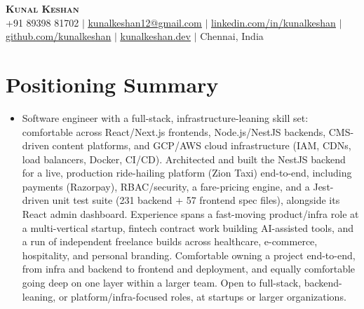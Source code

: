 \documentclass[letterpaper,11pt]{article}
\newcommand{\resumeItem}[1]{
  \item\small{
    {#1 \vspace{-2pt}}
  }
}
\newcommand{\resumeSubHeadingListStart}{\begin{itemize}[leftmargin=0.15in, label={}]}
\newcommand{\resumeSubHeadingListEnd}{\end{itemize}}
\begin{document}
\begin{center}
    \textbf{\Huge \scshape Kunal Keshan} \\ \vspace{1pt}
    \small +91 89398 81702 $|$ \href{mailto:kunalkeshan12@gmail.com}{\underline{kunalkeshan12@gmail.com}} $|$
    \href{https://linkedin.com/in/kunalkeshan}{\underline{linkedin.com/in/kunalkeshan}} $|$
    \href{https://github.com/kunalkeshan}{\underline{github.com/kunalkeshan}} $|$
    \href{https://kunalkeshan.dev}{\underline{kunalkeshan.dev}} $|$
    Chennai, India
\end{center}


\section{Positioning Summary}
\resumeSubHeadingListStart
  \resumeItem{Software engineer with a full-stack, infrastructure-leaning skill set: comfortable across React/Next.js frontends, Node.js/NestJS backends, CMS-driven content platforms, and GCP/AWS cloud infrastructure (IAM, CDNs, load balancers, Docker, CI/CD). Architected and built the NestJS backend for a live, production ride-hailing platform (Zion Taxi) end-to-end, including payments (Razorpay), RBAC/security, a fare-pricing engine, and a Jest-driven unit test suite (231 backend + 57 frontend spec files), alongside its React admin dashboard. Experience spans a fast-moving product/infra role at a multi-vertical startup, fintech contract work building AI-assisted tools, and a run of independent freelance builds across healthcare, e-commerce, hospitality, and personal branding. Comfortable owning a project end-to-end, from infra and backend to frontend and deployment, and equally comfortable going deep on one layer within a larger team. Open to full-stack, backend-leaning, or platform/infra-focused roles, at startups or larger organizations.}
\resumeSubHeadingListEnd


\end{document}

